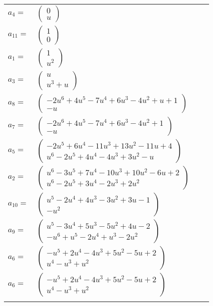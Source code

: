 \documentclass[1p]{elsarticle_modified}
\theoremstyle{definition}
\begin{document}
\begin{tabular}{m{7pt} m{180pt} m{7pt} m{180pt} }
\flushright $a_{4}=$&$\begin{pmatrix}0\\u\end{pmatrix}$ \\
\flushright $a_{11}=$&$\begin{pmatrix}1\\0\end{pmatrix}$ \\
\flushright $a_{1}=$&$\begin{pmatrix}1\\u^2\end{pmatrix}$ \\
\flushright $a_{3}=$&$\begin{pmatrix}u\\u^3+u\end{pmatrix}$ \\
\flushright $a_{8}=$&$\begin{pmatrix}-2 u^6+4 u^5-7 u^4+6 u^3-4 u^2+u+1\\- u\end{pmatrix}$ \\
\flushright $a_{7}=$&$\begin{pmatrix}-2 u^6+4 u^5-7 u^4+6 u^3-4 u^2+1\\- u\end{pmatrix}$ \\
\flushright $a_{5}=$&$\begin{pmatrix}-2 u^5+6 u^4-11 u^3+13 u^2-11 u+4\\u^6-2 u^5+4 u^4-4 u^3+3 u^2- u\end{pmatrix}$ \\
\flushright $a_{2}=$&$\begin{pmatrix}u^6-3 u^5+7 u^4-10 u^3+10 u^2-6 u+2\\u^6-2 u^5+3 u^4-2 u^3+2 u^2\end{pmatrix}$ \\
\flushright $a_{10}=$&$\begin{pmatrix}u^5-2 u^4+4 u^3-3 u^2+3 u-1\\- u^2\end{pmatrix}$ \\
\flushright $a_{9}=$&$\begin{pmatrix}u^5-3 u^4+5 u^3-5 u^2+4 u-2\\- u^6+u^5-2 u^4+u^3-2 u^2\end{pmatrix}$ \\
\flushright $a_{6}=$&$\begin{pmatrix}- u^5+2 u^4-4 u^3+5 u^2-5 u+2\\u^4- u^3+u^2\end{pmatrix}$\\ \flushright $a_{6}=$&$\begin{pmatrix}- u^5+2 u^4-4 u^3+5 u^2-5 u+2\\u^4- u^3+u^2\end{pmatrix}$\\&\end{tabular}
\end{document}
